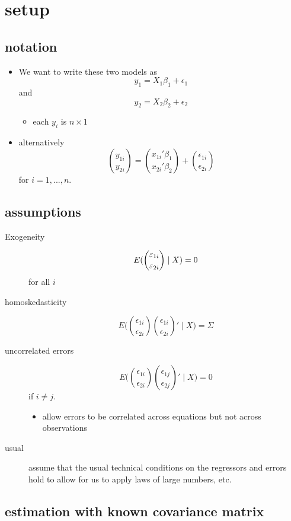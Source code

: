 \section{setup}
\subsection{notation}

\begin{itemize}[leftmargin=0pt]
\item We want to write these two models as
       \[y_1 = X_1 \beta_1 + \epsilon_1\]
       and
       \[y_2 = X_2 \beta_2 + \epsilon_2\]
\begin{itemize}
\item each $y_i$ is $n \times 1$
\end{itemize}
\item alternatively
  \[ \binom{y_{1i}}{y_{2i}} = \binom{x_{1i}'\beta_1}{x_{2i}'\beta_2} + 
  \binom{\epsilon_{1i}}{ \epsilon_{2i}}\]
       for $i = 1,...,n$.
\end{itemize}

\subsection{assumptions}

\begin{description}
\item[Exogeneity] \[E(\binom{\varepsilon_{1i}}{\varepsilon_{2i}} \mid X) = 0\] for all $i$
\item[homoskedasticity] \[E\Big(\binom{\epsilon_{1i}}{\epsilon_{2i}} \binom{\epsilon_{1i}}{\epsilon_{2i}}' \mid X \Big) = \Sigma\]
\item[uncorrelated errors] \[E\Big(\binom{\epsilon_{1i}}{\epsilon_{2i}}
  \binom{\epsilon_{1j}}{\epsilon_{2j}}' \mid X \Big) = 0\] if $i \neq j$.
\begin{itemize}
\item allow errors to be correlated across equations but not across
         observations
\end{itemize}
\item[usual] assume that the usual technical conditions on the
                regressors and errors hold to allow for us to apply
                laws of large numbers, etc.
\end{description}

\subsection{estimation with known covariance matrix}

